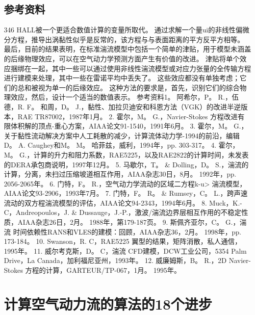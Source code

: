 \documentclass[UTF8,11pt,a4paper,openany,fontset=fandol]{ctexbook}
\begin{document}
\section{参考资料}
346 HALL被一个更适合数值计算的变量所取代。 通过求解一个量ui的非线性偏微分方程，推导出涡黏性似乎是反常的，该方程与与表面距离的平方反平方相等。 最后，目前的结果表明，在标准湍流模型中包括一个简单的津贴，用于模型未涵盖的后缘物理效应，可以在空气动力学预测方面产生有价值的改进。 津贴将单个效应捆绑在一起，其中一些可以通过使用非线性湍流模型或对应力张量的全传输方程进行建模来处理，其中一些在雷诺平均中丢失了。 这些效应都没有单独考虑；它们的总和被视为单一的后缘效应。 这种方法的要求是，首先，识别它们的综合物理效应，然后，设计一个适当的数值表示。 参考资料1。 阿希尔，P。 R.，伍德，R. F。 和周，D。 J.，黏性、加拉贝迪安和科恩方法（VGK）的改进半逆版本，RAE TR87002，1987年1月。 2. 霍尔，M。 G.，Navier-Stokes 方程改进有限体积解的顶点-重心方案，AIAA论文91-1540，1991年6月。 3. 霍尔，M。 G.，关于黏性流动解决方案中人工耗散的减少，计算流体动力学-1994的前沿，编辑D。 A. Caughey和M。 M。 哈菲兹，威利，1994年，pp. 303-317。 4. 霍尔，M。 G.，计算的升力和阻力系数，RAE5225，以及RAE2822的计算时间，未发表的DERA承包商说明，1997年12月。 5. 马歇尔，T。 \& Dolling，D。 S.，湍流的计算，分离，未扫过压缩坡道相互作用，AIAA杂志30日，8月。 1992年，pp. 2056-2065年。 6. 门特，F。 R.，空气动力学流动的区域二方程k-u> 湍流模型，AIAA论文93-2906，1993年7月。 7. 门特，F。 R。 \& Rumsey，C。 L.，跨声速流动的双方程湍流模型的评估，AIAA论文94-2343，1994年6月。 8. Muck，K.-C，Andreopoulos，J. \& Dussauge，J.-P.，激波/湍流边界层相互作用的不稳定性质，AIAA杂志26日，2月。 1988年，第179-187页。 9. 斯佩齐亚尔，C。 G.，湍流 时间依赖性RANS和VLES的建模：回顾，AIAA杂志36，2月。 1998年，pp. 173-184。 10. Swanson，R. C，RAE5225 翼型的结果，矩阵消散，私人通信，1995年。 11. 威尔考克斯，D。 C，湍流 CFD建模，DCW工业公司，5354 Palm Drive，La Canada，加利福尼亚州，1993年。 12. 威廉姆斯，B。 R.，2D Navier-Stokes 方程的计算，GARTEUR/TP-067，1月。 1995年。

\clearpage
\chapter{计算空气动力流的算法的18个进步}
\end{document}
